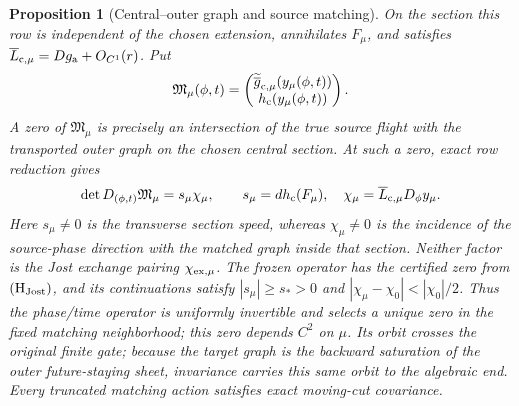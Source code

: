 \documentclass[11pt,reqno]{amsart}
\numberwithin{equation}{section}
\newtheorem{proposition}[theorem]{Proposition}
\theoremstyle{definition}
\theoremstyle{remark}
\begin{document}
\begin{proposition}[Central--outer graph and source matching]
On the section this row is independent of the chosen extension, annihilates
$F_\mu$, and satisfies
$\overline L_{{\rm c},\mu}=Dg_{\rm a}+O_{C^1}(r)$.  Put
\begin{equation}\label{eq:matching-operator}
 \mathfrak M_\mu(\phi,t)=
 \begin{pmatrix}
  \widetilde{\overline g}_{{\rm c},\mu}(y_\mu(\phi,t))\\
  h_{\rm c}(y_\mu(\phi,t))
 \end{pmatrix}.
\end{equation}
A zero of $\mathfrak M_\mu$ is precisely an intersection of the true source
flight with the transported outer graph on the chosen central section.  At
such a zero, exact row reduction gives
\begin{equation}\label{eq:matching-determinant}
 \det D_{(\phi,t)}\mathfrak M_\mu=s_\mu\chi_\mu,\qquad
 s_\mu=dh_{\rm c}(F_\mu),\quad
 \chi_\mu=\overline L_{{\rm c},\mu}D_\phi y_\mu .
\end{equation}
Here $s_\mu\ne0$ is the transverse section speed, whereas $\chi_\mu\ne0$
is the incidence of the source-phase direction with the matched graph inside
that section.  Neither factor is the Jost exchange pairing
$\chi_{{\rm ex},\mu}$.  The frozen operator has the certified zero from
${\rm(H_{Jost})}$, and its continuations satisfy
$|s_\mu|\ge s_*>0$ and
$|\chi_\mu-\chi_0|<|\chi_0|/2$.  Thus the phase/time operator is uniformly
invertible and selects a unique zero in the fixed matching neighborhood;
this zero depends $C^2$ on $\mu$.  Its orbit crosses the original finite gate; because the
target graph is the backward saturation of the outer future-staying sheet,
invariance carries this same orbit to the algebraic end.  Every truncated
matching action satisfies exact moving-cut covariance.
\end{proposition}
\end{document}
